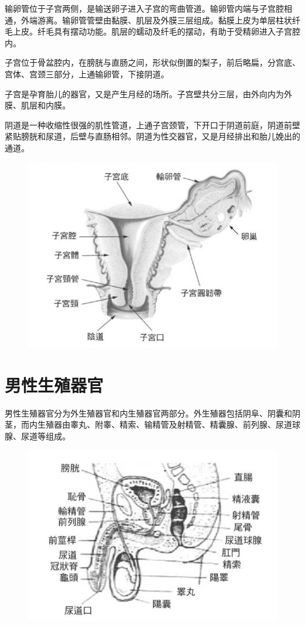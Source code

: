 \documentclass[12pt,UTF8]{ctexbook}
\begin{document}
输卵管位于子宫两侧，是输送卵子进入子宫的弯曲管道。输卵管内端与子宫腔相通，外端游离。输卵管管壁由黏膜、肌层及外膜三层组成。黏膜上皮为单层柱状纤毛上皮。纤毛具有摆动功能。肌层的蠕动及纤毛的摆动，有助于受精卵进入子宫腔内。

子宫位于骨盆腔内，在膀胱与直肠之间，形状似倒置的梨子，前后略扁，分宫底、宫体、宫颈三部分，上通输卵管，下接阴道。

子宫是孕育胎儿的器官，又是产生月经的场所。子宫壁共分三层，由外向内为外膜、肌层和内膜。

阴道是一种收缩性很强的肌性管道，上通子宫颈管，下开口于阴道前庭，阴道前壁紧贴膀胱和尿道，后壁与直肠相邻。阴道为性交器官，又是月经排出和胎儿娩出的通道。

\begin{figure}[htbp]
	\centering
	\includegraphics[width=0.7\linewidth]{3}
	\caption{}
\end{figure}

\section{男性生殖器官}

男性生殖器官分为外生殖器官和内生殖器官两部分。外生殖器包括阴阜、阴囊和阴茎，而内生殖器由睾丸、附睾、精索、输精管及射精管、精囊腺、前列腺、尿道球腺、尿道等组成。

\begin{figure}[htbp]
	\centering
	\includegraphics[width=0.7\linewidth]{4}
	\caption{}
\end{figure}
\end{document}
